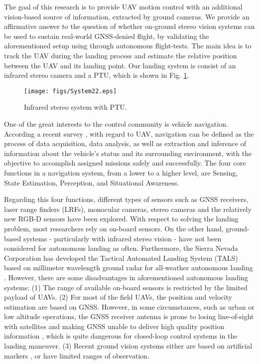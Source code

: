 \documentclass[letterpaper, 10 pt, conference]{ieeeconf}  %
\begin{document}
The goal of this research is to provide UAV motion control with an additional vision-based source of information, extracted by ground cameras. We provide an affirmative answer to the question of whether on-ground stereo vision systems can be used to sustain real-world GNSS-denied flight, by validating the aforementioned setup using through autonomous flight-tests. The main idea is to track the UAV during the landing process and estimate the relative position between the UAV and its landing point. Our landing system is consist of an infrared stereo camera and a PTU, which is shown in Fig. \ref{fig:system2}.
   \begin{figure}[!tb]
      \centering
      \texttt{[image: figs/System22.eps]}
      \caption{Infrared stereo system with PTU.}
      \label{fig:system2}
   \end{figure}

One of the great interests to the control community is vehicle navigation. According a recent survey \cite{Kendoul2012}, with regard to UAV, navigation can be defined as the process of data acquisition, data analysis, as well as extraction and inference of information about the vehicle's status and its surrounding environment, with the objective to accomplish assigned missions safely and successfully. The four core functions in a navigation system, from a lower to a higher level, are Sensing, State Estimation, Perception, and Situational Awareness.

Regarding this four functions, different types of sensors such as GNSS receivers, laser range finders (LRFs)\cite{Wu2013}\cite{Vasconcelos2010}, monocular cameras\cite{Wu2010}\cite{Weiss2011}, stereo cameras and the relatively new  RGB-D sensors\cite{Lange2012}\cite{Bachrach2012} have been explored. With respect to solving the landing problem, most researchers rely on on-board sensors\cite{Templeton2007}\cite{Wu2010}. On the other hand, ground-based systems\cite{PEBRIANTI2010}\cite{Abbeel2010}\cite{Wang2006} - particularly with infrared stereo vision - have not been considered for autonomous landing as often. Furthermore, the Sierra Nevada Corporation has developed the Tactical Automated Landing System (TALS) based on millimeter wavelength ground radar for all-weather autonomous landing \cite{TALS}. However, there are some disadvantages in aforementioned autonomous 
landing systems: (1) The range of available on-board sensors is restricted by the limited payload of UAVs. (2) For most of the field UAVs, the position and velocity estimation are based on GNSS. However, in some circumstances, such as urban or low altitude operations, the GNSS receiver antenna is prone to losing line-of-sight with satellites and making GNSS unable to deliver high quality position information \cite{RePEc:cdl:itsrrp:qt5tn6b3cp}, which is quite dangerous for closed-loop control systems in the landing maneuver. (3) Recent ground vision systems either are based on artificial markers \cite{Martnez2011a}, \cite{Martinez2009} or have limited ranges of observation\cite{Wang2006}.
\end{document}
